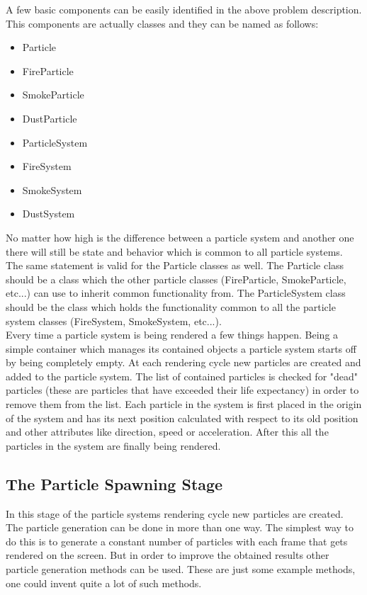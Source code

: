 A few basic components can be easily identified in the above problem description. This components are actually classes and they can be named as follows:

\begin{itemize}
	\item Particle
	\item FireParticle
	\item SmokeParticle
	\item DustParticle
	\item ParticleSystem
	\item FireSystem
	\item SmokeSystem
	\item DustSystem
\end{itemize}

No matter how high is the difference between a particle system and another one there will still be state and behavior which is common to all particle systems. The same statement is valid for the Particle classes as well. The Particle class should be a class which the other particle classes (FireParticle, SmokeParticle, etc...) can use to inherit common functionality from. The ParticleSystem class should be
the class which holds the functionality common to all the particle system classes (FireSystem, SmokeSystem, etc...).\\

Every time a particle system is being rendered a few things happen. Being a simple container which manages its contained objects a particle system starts off by being completely empty. At each rendering cycle new particles are created and added to the particle system. The list of contained particles is checked for "dead" particles (these are particles that have exceeded their life expectancy) in order to remove them from the list. Each particle in the system is first placed in the origin of the system and has its next position calculated with respect to its old position and other attributes like direction, speed or acceleration. After this all the particles in the system are finally being rendered.\\

\newpage
\subsection{The Particle Spawning Stage}
In this stage of the particle systems rendering cycle new particles are created. The particle generation can be done in more than one way. The simplest way to do this is to generate a constant number of particles with each frame that gets rendered on the screen. But in order to improve the obtained results other particle generation methods can be used. These are just some example methods, one could invent quite a lot of such methods.\\


